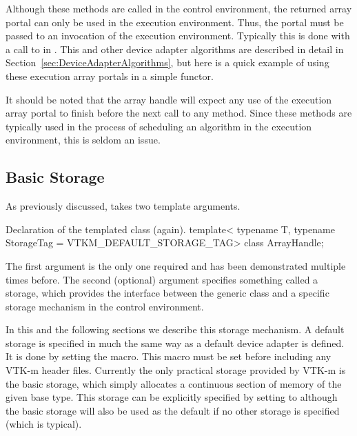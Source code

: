 Although these  methods are called in the control
environment, the returned array portal can only be used in the execution
environment. Thus, the portal must be passed to an invocation of the
execution environment. Typically this is done with a call to
 in . This and other
device adapter algorithms are described in detail in
Section~\ref{sec:DeviceAdapterAlgorithms}, but here is a quick example of
using these execution array portals in a simple functor.


It should be noted that the array handle will expect any use of the
execution array portal to finish before the next call to any
 method. Since these  methods
are typically used in the process of scheduling an algorithm in the
execution environment, this is seldom an issue.

\subsection{Basic Storage}


As previously discussed,  takes two template arguments.
\begin{vtkmexample}{Declaration of the \protect{} templated class (again).}
template<
    typename T,
    typename StorageTag = VTKM_DEFAULT_STORAGE_TAG>
class ArrayHandle;
\end{vtkmexample}
The first argument is the only one required and has been demonstrated
multiple times before. The second (optional) argument specifies something
called a storage, which provides the interface between the generic
 class and a specific storage mechanism in the
control environment.

In this and the following sections we describe this storage mechanism.  A
default storage is specified in much the same way as a default device
adapter is defined. It is done by setting the 
macro. This macro must be set before including any VTK-m header
files. Currently the only practical storage provided by VTK-m is the basic
storage, which simply allocates a continuous section of memory of the given
base type. This storage can be explicitly specified by setting
 to  although the
basic storage will also be used as the default if no other storage is
specified (which is typical).

